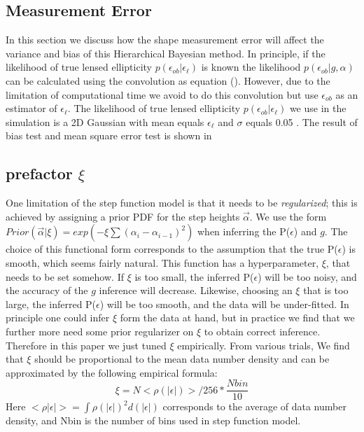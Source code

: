 \documentclass[useAMS,usenatbib]{mn2e}
\begin{document}
\subsection{Measurement Error}
In this section we  discuss how the shape measurement error will
affect the variance and bias of this Hierarchical Bayesian method.
In principle, if the likelihood of true lensed ellipticity $p(\epsilon_{ob}|\epsilon_{\ell})$
is known the likelihood $p(\epsilon_{ob}|g,\alpha)$ can be calculated using the convolution as equation ().
However, due to the limitation of computational time we avoid to do this convolution but use $\epsilon_{ob}$
as an estimator of $\epsilon_{\ell}$.
The likelihood of true lensed ellipticity $p(\epsilon_{ob}|\epsilon_{\ell})$ we use in the simulation is a 2D
Gaussian with mean equals $\epsilon_{\ell}$ and $\sigma$ equals 0.05 .
The result of bias test and mean square error test is shown in 




\subsection{prefactor $\xi$}

One limitation of the step function model is that it needs to be \textit{regularized};
this is achieved by assigning a prior PDF for the step heights $\vec{\alpha}$.
We use the form $Prior(\vec{\alpha}|\xi)=exp(-\xi\sum(\alpha_{i}-\alpha_{i-1})^{2})$
when inferring the P($\epsilon$) and $g$. The choice of this functional
form corresponds to the assumption that the true P($\epsilon$) is
smooth, which seems fairly natural. This function has a hyperparameter,
$\xi$, that needs to be set somehow. If $\xi$ is too small, the
inferred P($\epsilon$) will be too noisy, and the accuracy of the
$g$ inference will decrease. Likewise, choosing an $\xi$ that is
too large, the inferred P($\epsilon$) will be too smooth, and the
data will be under-fitted. In principle one could infer $\xi$ form
the data at hand, but in practice we find that we further more need some
prior regularizer on $\xi$ to obtain correct inference. Therefore in this paper 
we just tuned $\xi$ empirically. From various trials, We find
that $\xi$ should be proportional to the mean data number density and can
be approximated by the following empirical formula: 
\begin{equation}
\xi=N<\rho(|\epsilon|)>/256*\frac{Nbin}{10}
\end{equation}
Here $<\rho|\epsilon|>=\int\rho(|\epsilon|)^{2}d(|\epsilon|)$ corresponds
to the average of data number density, and Nbin is the number of bins used 
in step function model. 
\end{document}
